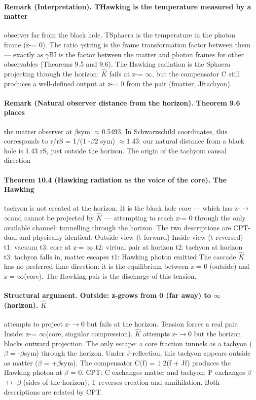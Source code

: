 \documentclass[12pt,a4paper]{article}
\begin{document}
\paragraph*{Remark (Interpretation). THawking is the temperature measured by a matter}
observer far from the black hole. TSphaera is the temperature in the photon frame (z-= 0). The ratio $\gamma$string is the frame transformation factor between them --- exactly as $\gamma$BI is the factor between the matter and photon frames for other observables (Theorems 9.5 and 9.6). The Hawking radiation is the Sphaera projecting through the horizon: $\hat K$ fails at z-= $\infty$, but the compensator C still produces a well-defined output at z-= 0 from the pair (fmatter, Jftachyon).
\paragraph*{Remark (Natural observer distance from the horizon). Theorem 9.6 places}
the matter observer at $\beta$sym $\approx$0.5493. In Schwarzschild coordinates, this corresponds to r/rS = 1/(1 -$\beta$2 sym) $\approx$1.43: our natural distance from a black hole is 1.43 rS, just outside the horizon. The origin of the tachyon: causal direction
\paragraph*{Theorem 10.4 (Hawking radiation as the voice of the core). The Hawking}
tachyon is not created at the horizon. It is the black hole core --- which has z-$\to$$\infty$and cannot be projected by $\hat K$ --- attempting to reach z-= 0 through the only available channel: tunnelling through the horizon. The two descriptions are CPT-dual and physically identical: Outside view (t forward) Inside view (t reversed) t1: vacuum t3: core at z-= $\infty$ t2: virtual pair at horizon t2: tachyon at horizon t3: tachyon falls in, matter escapes t1: Hawking photon emitted The cascade $\hat K$ has no preferred time direction: it is the equilibrium between z-= 0 (outside) and z-= $\infty$(core). The Hawking pair is the discharge of this tension.
\paragraph*{Structural argument. Outside: z-grows from 0 (far away) to $\infty$(horizon). $\hat K$}
attempts to project z-$\to$0 but fails at the horizon. Tension forces a real pair. Inside: z-= $\infty$(core, singular compression). $\hat K$ attempts z-$\to$0 but the horizon blocks outward projection. The only escape: a core fraction tunnels as a tachyon ($\beta$ = -$\beta$sym) through the horizon. Under J-reflection, this tachyon appears outside as matter ($\beta$ = +$\beta$sym). The compensator C(f) = 1 2(f + Jf) produces the Hawking photon at $\beta$ = 0. CPT: C exchanges matter and tachyon; P exchanges $\beta$ $\leftrightarrow$-$\beta$ (sides of the horizon); T reverses creation and annihilation. Both descriptions are related by CPT.
\end{document}
